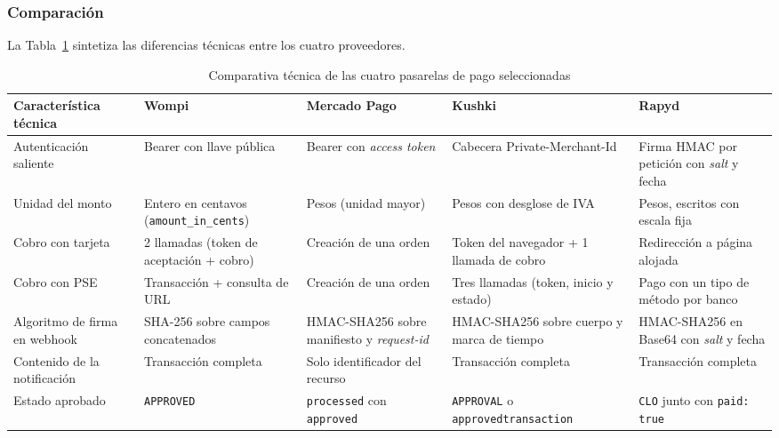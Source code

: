\subsubsection{Comparación}
La Tabla~\ref{tab:comparativa-pasarelas} sintetiza las diferencias técnicas entre los cuatro proveedores.

\begin{table}[H]
\renewcommand{\arraystretch}{1.2}
\centering
\begin{tabular}{|p{2.9cm}|p{2.6cm}|p{2.6cm}|p{2.6cm}|p{2.6cm}|}
\hline
\textbf{Característica técnica} & \textbf{Wompi} & \textbf{Mercado Pago} & \textbf{Kushki} & \textbf{Rapyd} \\ \hline
Autenticación saliente & Bearer con llave pública & Bearer con \textit{access token} & Cabecera Private-\allowbreak Merchant-\allowbreak Id & Firma HMAC por petición con \textit{salt} y fecha \\ \hline
Unidad del monto & Entero en centavos (\texttt{amount\_\allowbreak in\_\allowbreak cents}) & Pesos (unidad mayor) & Pesos con desglose de IVA & Pesos, escritos con escala fija \\ \hline
Cobro con tarjeta & 2 llamadas (token de aceptación + cobro) & Creación de una orden & Token del navegador + 1 llamada de cobro & Redirección a página alojada \\ \hline
Cobro con PSE & Transacción + consulta de URL & Creación de una orden & Tres llamadas (token, inicio y estado) & Pago con un tipo de método por banco \\ \hline
Algoritmo de firma en webhook & SHA-256 sobre campos concatenados & HMAC-SHA256 sobre manifiesto y \textit{request-id} & HMAC-SHA256 sobre cuerpo y marca de tiempo & HMAC-SHA256 en Base64 con \textit{salt} y fecha \\ \hline
Contenido de la notificación & Transacción completa & Solo identificador del recurso & Transacción completa & Transacción completa \\ \hline
Estado aprobado & \texttt{APPROVED} & \texttt{processed} con \texttt{approved} & \texttt{APPROVAL} o \texttt{approved\allowbreak transaction} & \texttt{CLO} junto con \texttt{paid: true} \\ \hline
\end{tabular}
\caption{Comparativa técnica de las cuatro pasarelas de pago seleccionadas}
\label{tab:comparativa-pasarelas}
\end{table}

